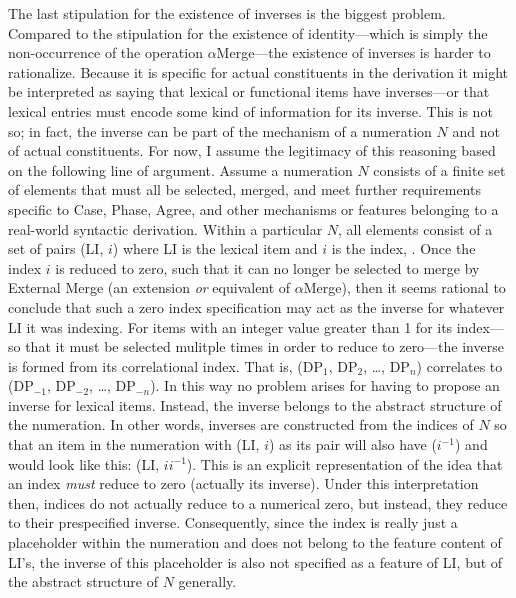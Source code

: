 \documentclass[11pt,twoside]{article}
\theoremstyle{plain}
\numberwithin{equation}{section}
\theoremstyle{definition}
\newtheorem{phrase string}{Phrase String}
\begin{document}
The last stipulation for the existence of inverses is the biggest problem. Compared to the stipulation for the existence of identity---which is simply the non-occurrence of the operation $\alpha$Merge---the existence of inverses is harder to rationalize. Because it is specific for actual constituents in the derivation it might be interpreted as saying that lexical or functional items have inverses---or that lexical entries must encode some kind of information for its inverse. This is not so; in fact, the inverse can be part of the mechanism of a numeration $N$ and not of actual constituents. For now, I assume the legitimacy of this reasoning  based on the following line of argument. Assume a numeration $N$ consists of a finite set of elements that must all be selected, merged, and meet further requirements specific to Case, Phase, Agree, and other mechanisms or features belonging to a real-world syntactic derivation. Within a particular $N$, all elements consist of a set of pairs (LI, $i$) where LI is the lexical item and $i$ is the index, \cite{chomsky95mp}. Once the index $i$ is reduced to zero, such that it can no longer be selected to merge by External Merge (an extension \textsl{or} equivalent of $\alpha$Merge), then it seems rational to conclude that such a zero index specification may act as the inverse for whatever LI it was indexing. For items with an integer value greater than 1 for its index---so that it must be selected mulitple times in order to reduce to zero---the inverse is formed from its correlational index. That is, (DP$_{1}$, DP$_{2}$, \ldots, DP$_{n}$) correlates to (DP$_{-1}$, DP$_{-2}$, \ldots, DP$_{-n}$). In this way no problem arises for having to propose an inverse for lexical items. Instead, the inverse belongs to the abstract structure of the numeration. In other words, inverses are constructed from the indices of $N$ so that an item in the numeration with (LI, $i$) as its pair will also have ($i^{-1}$) and would look like this: (LI, $ii^{-1}$). This is an explicit representation of the idea that an index \textsl{must} reduce to zero (actually its inverse). Under this interpretation then, indices do not actually reduce to a numerical zero, but instead, they reduce to their prespecified inverse. Consequently, since the index is really just a placeholder within the numeration and does not belong to the feature content of LI's, the inverse of this placeholder is also not specified as a feature of LI, but of the abstract structure of $N$ generally.
\end{document}
